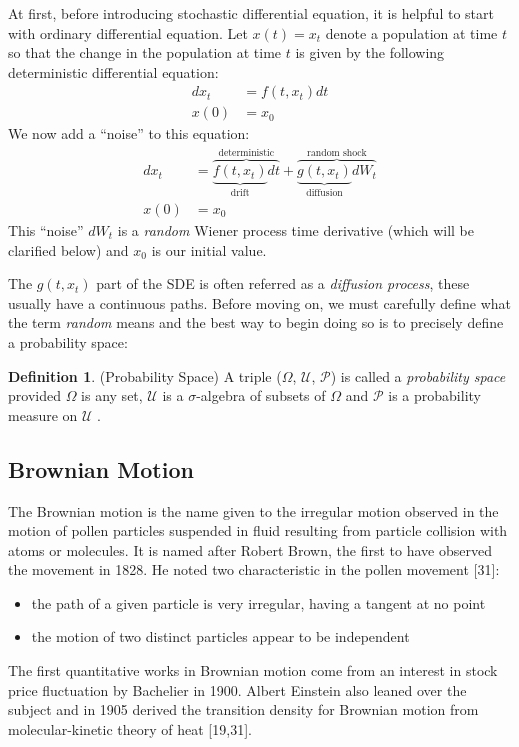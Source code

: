 \documentclass[12pt,twoside]{reedthesis}
\theoremstyle{definition}
\newtheorem{definition}{Definition}[section]
\theoremstyle{definition}
\theoremstyle{remark}
\begin{document}
  At first, before introducing stochastic differential equation, it is
  helpful to start with ordinary differential equation. Let \(x(t) = x_t\)
  denote a population at time \(t\) so that the change in the population
  at time \(t\) is given by the following deterministic differential
  equation:
  \begin{align}
  dx_t &= f(t, x_t)dt \\
  x(0) &= x_0 \nonumber
  \end{align}
  We now add a ``noise'' to this equation:
  \begin{align} \label{eq:sde1}
  dx_t &= \overbrace{\underbrace{f(t, x_t)}_\text{drift}dt}^\text{deterministic} + \overbrace{\underbrace{g(t, x_t)}_\text{diffusion}dW_t}^\text{random shock} \\
  x(0) &= x_0 \nonumber
  \end{align}
  This ``noise'' \(dW_t\) is a \emph{random} Wiener process time
  derivative (which will be clarified below) and \(x_0\) is our initial
  value.
  
  The \(g(t, x_t)\) part of the SDE is often referred as a \emph{diffusion
  process}, these usually have a continuous paths. Before moving on, we
  must carefully define what the term \emph{random} means and the best way
  to begin doing so is to precisely define a probability space:
  \begin{definition}{(Probability Space)} A triple ($\Omega$, $\mathcal {U}$, $\mathcal {P}$) is called a \textit{probability space} provided $\Omega$ is any set, $\mathcal {U}$ is a $\sigma$-algebra of subsets of $\Omega$ and $\mathcal {P}$ is a probability measure on $\mathcal {U}$ .
  \end{definition}
  \subsection{Brownian Motion}\label{brownian-motion}
  
  The Brownian motion is the name given to the irregular motion observed
  in the motion of pollen particles suspended in fluid resulting from
  particle collision with atoms or molecules. It is named after Robert
  Brown, the first to have observed the movement in 1828. He noted two
  characteristic in the pollen movement {[}31{]}:
  \begin{itemize}
  \item
    the path of a given particle is very irregular, having a tangent at no
    point
  \item
    the motion of two distinct particles appear to be independent
  \end{itemize}
  The first quantitative works in Brownian motion come from an interest in
  stock price fluctuation by Bachelier in 1900. Albert Einstein also
  leaned over the subject and in 1905 derived the transition density for
  Brownian motion from molecular-kinetic theory of heat {[}19,31{]}.
  
\end{document}
